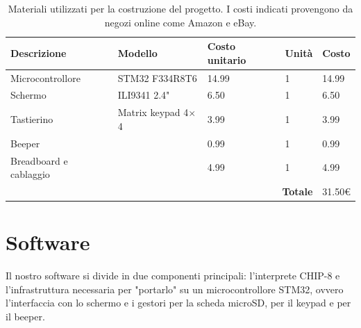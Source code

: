 \documentclass[a4paper]{article}
\begin{document}
\begin{center}
    \begin{table}[ht]
        \centering
        \begin{tabular}{|llll|l|}
            \hline
            \multicolumn{1}{|l|}{\textbf{Descrizione}}          & \multicolumn{1}{l|}{\textbf{Modello}}       & \multicolumn{1}{l|}{\textbf{Costo unitario}} & \textbf{Unità} & \textbf{Costo} \\ \hline
            \multicolumn{1}{|l|}{Microcontrollore}       & \multicolumn{1}{l|}{STM32 F334R8T6}         & \multicolumn{1}{l|}{14.99}                   & 1               & 14.99          \\ \hline
            \multicolumn{1}{|l|}{Schermo}                & \multicolumn{1}{l|}{ILI9341 2.4"}           & \multicolumn{1}{l|}{6.50}                    & 1               & 6.50           \\ \hline
            \multicolumn{1}{|l|}{Tastierino}          & \multicolumn{1}{l|}{Matrix keypad 4$\times$4} & \multicolumn{1}{l|}{3.99}                    & 1               & 3.99           \\ \hline
            \multicolumn{1}{|l|}{Beeper}                 & \multicolumn{1}{l|}{}                       & \multicolumn{1}{l|}{0.99}                    & 1               & 0.99           \\ \hline
            \multicolumn{1}{|l|}{Breadboard e cablaggio} & \multicolumn{1}{l|}{}                       & \multicolumn{1}{l|}{4.99}                    & 1               & 4.99           \\ \hline
            \multicolumn{4}{|r|}{\textbf{Totale}}                                                      & 31.50\euro    \\ \hline
        \end{tabular}
        \caption{
            Materiali utilizzati per la costruzione del progetto. I costi indicati provengono da negozi online come Amazon e eBay.
        }
    \end{table}
\end{center}

\section{Software}

Il nostro software si divide in due componenti principali:
l'interprete CHIP-8 e l'infrastruttura necessaria per "portarlo"
su un microcontrollore STM32, ovvero l'interfaccia con lo schermo
e i gestori per la scheda microSD, per il keypad e per il beeper.
\end{document}
